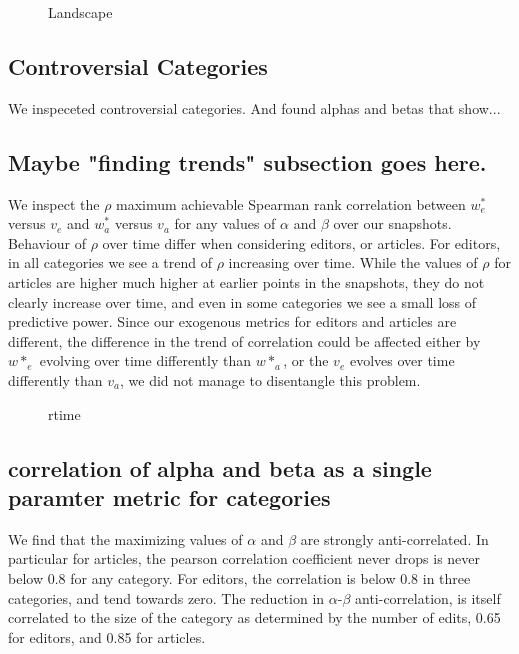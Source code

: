 \documentclass{acm_proc_article-sp}
\begin{document}
\begin{figure}[!t]
\centering
\caption{Landscape}
\label{fig:landscape}
\end{figure}

\subsection{Controversial Categories}
We inspeceted controversial categories. And found alphas and betas that show...

\subsection{Maybe "finding trends" subsection goes here.}
We inspect the $\rho$ maximum achievable  Spearman rank correlation between $w^*_e$ versus $v_e$ and $w^*_a$ versus $v_a$ for any values of $\alpha$ and $\beta$ over our snapshots. Behaviour of $\rho$ over time differ when considering editors, or articles. For editors, in all categories we see a trend of $\rho$ increasing over time. While the values of $\rho$ for articles are higher much higher at earlier points in the snapshots, they do not clearly increase over time, and even in some categories we see a small loss of predictive power. Since our exogenous metrics for editors and articles are different, the difference in the trend of correlation could be affected either by $w*_e$ evolving over time differently than $w*_a$, or the $v_e$ evolves over time differently than $v_a$, we did not manage to disentangle this problem.

\begin{figure}[!t]
\centering
\caption{rtime}
\label{fig:rtime}
\end{figure}

\subsection{correlation of alpha and beta as a single paramter metric for categories}


We find that the maximizing values of $\alpha$ and $\beta$ are strongly anti-correlated. In particular for articles, the pearson correlation coefficient never drops is never below 0.8 for any category. For editors, the correlation is below 0.8 in three categories, and tend towards zero. The reduction in $\alpha$-$\beta$ anti-correlation, is itself correlated to the size of the category as determined by the number of edits, 0.65 for editors, and 0.85 for articles. 
\end{document}
